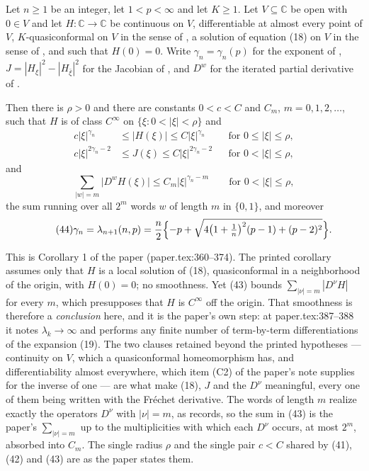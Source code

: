\begin{corollary}
Let $n\ge1$ be an integer, let $1<p<\infty$ and let $K\ge1$.  Let
$V\subseteq\mathbb{C}$ be open with $0\in V$ and let
$H\colon\mathbb{C}\to\mathbb{C}$ be continuous on $V$, differentiable at almost
every point of $V$, $K$-quasiconformal on $V$ in the sense of
, a solution of equation (18) on $V$ in the sense of
, and such that $H(0)=0$.  Write
$\gamma_n=\gamma_n(p)$ for the exponent of ,
$J=|H_\xi|^2-|H_{\bar\xi}|^2$ for the Jacobian of , and $D^{w}$
for the iterated partial derivative of .

Then there is $\rho>0$ and there are constants $0<c<C$ and $C_m$,
$m=0,1,2,\dots$, such that $H$ is of class $C^\infty$ on
$\{\xi:0<|\xi|<\rho\}$ and
\begin{align}
  c|\xi|^{\gamma_n}&\le|H(\xi)|\le C|\xi|^{\gamma_n}
    &&\text{for }0\le|\xi|\le\rho,\tag{41}\\
  c|\xi|^{2\gamma_n-2}&\le J(\xi)\le C|\xi|^{2\gamma_n-2}
    &&\text{for }0<|\xi|\le\rho,\tag{42}
\end{align}
and
\begin{equation}\tag{43}
  \sum_{|w|=m}\bigl|D^{w}H(\xi)\bigr|\le C_m|\xi|^{\gamma_n-m}
  \qquad\text{for }0<|\xi|\le\rho,
\end{equation}
the sum running over all $2^m$ words $w$ of length $m$ in $\{0,1\}$, and
moreover
\begin{equation}\tag{44}
  \gamma_n=\lambda_{n+1}(n,p)
  =\frac n2\Bigl\{-p+\sqrt{4\bigl(1+\tfrac1n\bigr)^2(p-1)+(p-2)^2}\Bigr\}.
\end{equation}

This is Corollary 1 of the paper (paper.tex:360--374).  The printed corollary
assumes only that $H$ is a local solution of (18), quasiconformal in a
neighborhood of the origin, with $H(0)=0$; no smoothness.  Yet (43) bounds
$\sum_{|\nu|=m}|D^\nu H|$ for every $m$, which presupposes that $H$ is
$C^\infty$ off the origin.  That smoothness is therefore a \emph{conclusion}
here, and it is the paper's own step: at paper.tex:387--388 it notes
$\lambda_k\to\infty$ and performs any finite number of term-by-term
differentiations of the expansion (19).  The two clauses retained beyond the
printed hypotheses --- continuity on $V$, which a quasiconformal homeomorphism
has, and differentiability almost everywhere, which item (C2) of the paper's
note supplies for the inverse of one --- are what make (18), $J$ and the $D^\nu$
meaningful, every one of them being written with the Fr\'echet derivative.  The words of length $m$
realize exactly the operators $D^\nu$ with $|\nu|=m$, as 
records, so the sum in (43) is the paper's $\sum_{|\nu|=m}$ up to the
multiplicities with which each $D^\nu$ occurs, at most $2^m$, absorbed into
$C_m$.  The single radius $\rho$ and the single pair $c<C$ shared by (41), (42)
and (43) are as the paper states them.
\end{corollary}
